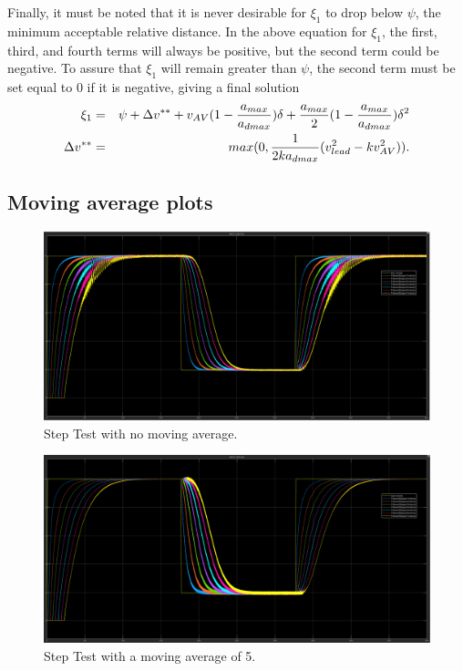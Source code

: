 \documentclass[conference]{IEEEtran}
\begin{document}
\begin{appendix}
Finally, it must be noted that it is never desirable for $\xi_1$ to drop below $\psi$, the minimum acceptable relative distance. In the above equation for $\xi_1$, the first, third, and fourth terms will always be positive, but the second term could be negative. To assure that $\xi_1$ will remain greater than $\psi$, the second term must be set equal to 0 if it is negative, giving a final solution
\begin{eqnarray*}
\xi_1 &=& \psi+\Delta v^{**}+v_{AV}(1-{a_{max}\over a_{dmax}})\delta+{a_{max}\over 2}(1-{a_{max}\over a_{dmax}})\delta^2 \\
\Delta v^{**} &=& max(0,{1\over 2ka_{dmax}}(v_{lead}^2-kv_{AV}^2)).
\end{eqnarray*}


\pagebreak
\subsection{Moving average plots}
\begin{figure}[htbp!]
\centerline{\includegraphics[width=6.50 in]{multiFS_velbad_ma1.PNG}}
\caption{Step Test with no moving average.}
\label{ma1}
\end{figure}

\begin{figure}[htbp!]
\centerline{\includegraphics[width=6.50 in]{multiFS_velbad_ma5.PNG}}
\caption{Step Test with a moving average of 5.}
\label{ma5}
\end{figure}


\end{appendix}
\end{document}
